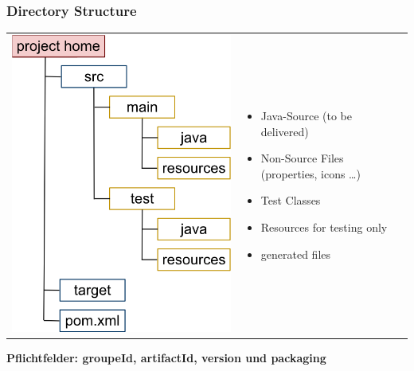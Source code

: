 \documentclass[10pt]{article}
\begin{document}
\subsubsection{Directory Structure}
\begin{center}
	\begin{tabular}{|ll|c} 
		\includegraphics[scale=0.5\textwidth]{assets/mvn_directory_structure.png} 
		& 
		\begin{itemize}
			\item Java-Source (to be delivered)
			\item Non-Source Files (properties, icons …)
			\item Test Classes
			\item Resources for testing only
			\item generated files
		\end{itemize}				
		\\
	\end{tabular}
\textbf{Pflichtfelder: groupeId, artifactId, version und packaging}
\end{center}
\end{document}
